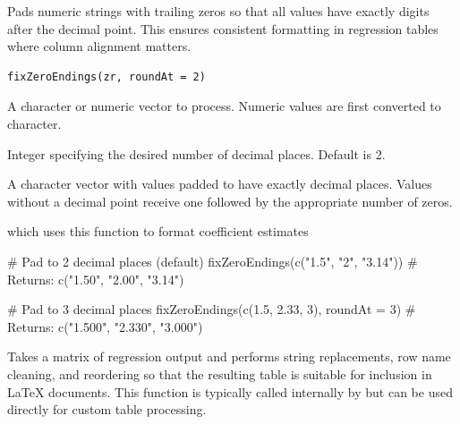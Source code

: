 \documentclass[a4paper]{book}
\begin{document}
%
\begin{Description}
Pads numeric strings with trailing zeros so that all values have exactly
 digits after the decimal point. This ensures consistent
formatting in regression tables where column alignment matters.
\end{Description}
%
\begin{Usage}
\begin{verbatim}
fixZeroEndings(zr, roundAt = 2)
\end{verbatim}
\end{Usage}
%
\begin{Arguments}
\begin{ldescription}
\item[\code{zr}] A character or numeric vector to process. Numeric values are first
converted to character.

\item[\code{roundAt}] Integer specifying the desired number of decimal places.
Default is 2.
\end{ldescription}
\end{Arguments}
%
\begin{Value}
A character vector with values padded to have exactly 
decimal places. Values without a decimal point receive one followed by
the appropriate number of zeros.
\end{Value}
%
\begin{SeeAlso}
 which uses this function to format
coefficient estimates
\end{SeeAlso}
%
\begin{Examples}
\begin{ExampleCode}
# Pad to 2 decimal places (default)
fixZeroEndings(c("1.5", "2", "3.14"))
# Returns: c("1.50", "2.00", "3.14")

# Pad to 3 decimal places
fixZeroEndings(c(1.5, 2.33, 3), roundAt = 3)
# Returns: c("1.500", "2.330", "3.000")

\end{ExampleCode}
\end{Examples}
%
\begin{Description}
Takes a matrix of regression output and performs string replacements,
row name cleaning, and reordering so that the resulting table is suitable
for inclusion in LaTeX documents. This function is typically called internally
by  but can be used directly for custom table processing.
\end{Description}
\end{document}

